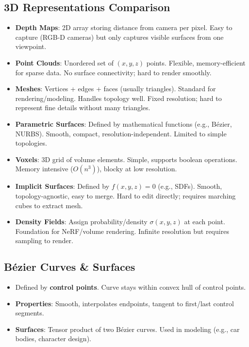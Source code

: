 \documentclass[11pt]{article}
\begin{document}
\subsection{3D Representations Comparison}
\begin{itemize}
    \item \textbf{Depth Maps}: 2D array storing distance from camera per pixel. Easy to capture (RGB-D cameras) but only captures visible surfaces from one viewpoint.
    \item \textbf{Point Clouds}: Unordered set of $(x,y,z)$ points. Flexible, memory-efficient for sparse data. No surface connectivity; hard to render smoothly.
    \item \textbf{Meshes}: Vertices + edges + faces (usually triangles). Standard for rendering/modeling. Handles topology well. Fixed resolution; hard to represent fine details without many triangles.
    \item \textbf{Parametric Surfaces}: Defined by mathematical functions (e.g., Bézier, NURBS). Smooth, compact, resolution-independent. Limited to simple topologies.
    \item \textbf{Voxels}: 3D grid of volume elements. Simple, supports boolean operations. Memory intensive ($O(n^3)$), blocky at low resolution.
    \item \textbf{Implicit Surfaces}: Defined by $f(x,y,z)=0$ (e.g., SDFs). Smooth, topology-agnostic, easy to merge. Hard to edit directly; requires marching cubes to extract mesh.
    \item \textbf{Density Fields}: Assign probability/density $\sigma(x,y,z)$ at each point. Foundation for NeRF/volume rendering. Infinite resolution but requires sampling to render.
\end{itemize}

\subsection{Bézier Curves \& Surfaces}
\begin{itemize}
    \item Defined by \textbf{control points}. Curve stays within convex hull of control points.
    \item \textbf{Properties}: Smooth, interpolates endpoints, tangent to first/last control segments.
    \item \textbf{Surfaces}: Tensor product of two Bézier curves. Used in modeling (e.g., car bodies, character design).
\end{itemize}
\end{document}
